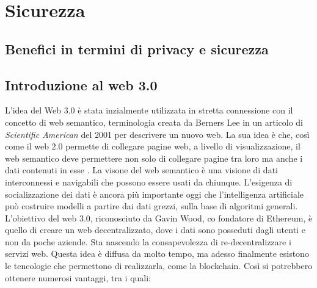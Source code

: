 \chapter{Sicurezza}
\section{Benefici in termini di privacy e sicurezza}

\section{Introduzione al web 3.0}
L'idea del Web 3.0 è stata inzialmente utilizzata in stretta connessione con il concetto di web semantico, terminologia creata da Berners Lee in un articolo di \textit{Scientific American} del 2001 per descrivere un nuovo web. 
La sua idea è che, così come il web 2.0 permette di collegare pagine web, a livello di visualizzazione, il web semantico deve permettere non solo di collegare pagine tra loro ma anche i dati contenuti in esse \cite{ted_youtube}.
La visone del web semantico è una visione di dati interconnessi e navigabili che possono essere usati da chiunque. L'esigenza di socializzazione dei dati è ancora più importante oggi che l'intelligenza artificiale può costruire modelli a partire dai dati grezzi, sulla base di algoritmi generali.
L'obiettivo del web 3.0, riconosciuto da Gavin Wood, co fondatore di Ethereum, è quello di creare un web decentralizzato, dove i dati sono posseduti dagli utenti e non da poche aziende. Sta nascendo la consapevolezza di re-decentralizzare i servizi web.
Questa idea è diffusa da molto tempo, ma adesso finalmente esistono le tencologie che permettono di realizzarla, come la blockchain.
Così si potrebbero ottenere numerosi vantaggi, tra i quali:
